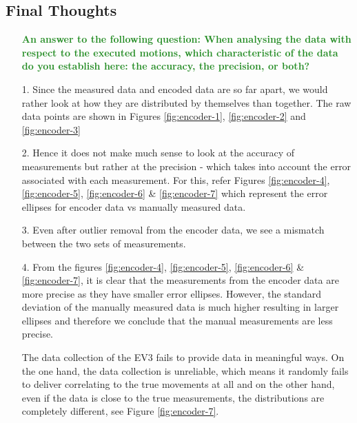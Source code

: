     \subsection{Final Thoughts}
    \begin{itemize}
        \item[] \textcolor{ForestGreen}{\textbf{An answer to the following question: When analysing the data with respect to the executed motions, which characteristic of the data do you establish here: the accuracy, the precision, or both?}}
        \item[1.] Since the measured data and encoded data are so far apart, we would rather look at how they are distributed by themselves than together. The raw data points are shown in Figures \ref{fig:encoder-1}, \ref{fig:encoder-2} and \ref{fig:encoder-3}
        \item[2.] Hence it does not make much sense to look at the accuracy of measurements but rather at the precision - which takes into account the error associated with each measurement. For this, refer Figures \ref{fig:encoder-4}, \ref{fig:encoder-5}, \ref{fig:encoder-6} \& \ref{fig:encoder-7} which represent the error ellipses for encoder data vs manually measured data.
        \item[3.] Even after outlier removal from the encoder data, we see a mismatch between the two sets of measurements.
        \item[4.] From the figures \ref{fig:encoder-4}, \ref{fig:encoder-5}, \ref{fig:encoder-6} \& \ref{fig:encoder-7}, it is clear that the measurements from the encoder data are more precise as they have smaller error ellipses. However, the standard deviation of the manually measured data is much higher resulting in larger ellipses and therefore we conclude that the manual measurements are less precise. 
        
        \item[] The data collection of the EV3 fails to provide data in meaningful ways. On the one hand, the data collection is unreliable, which means it randomly fails to deliver correlating to the true movements at all and on the other hand, even if the data is close to the true measurements, the distributions are completely different, see Figure \ref{fig:encoder-7}.
    \end{itemize}
    
    
